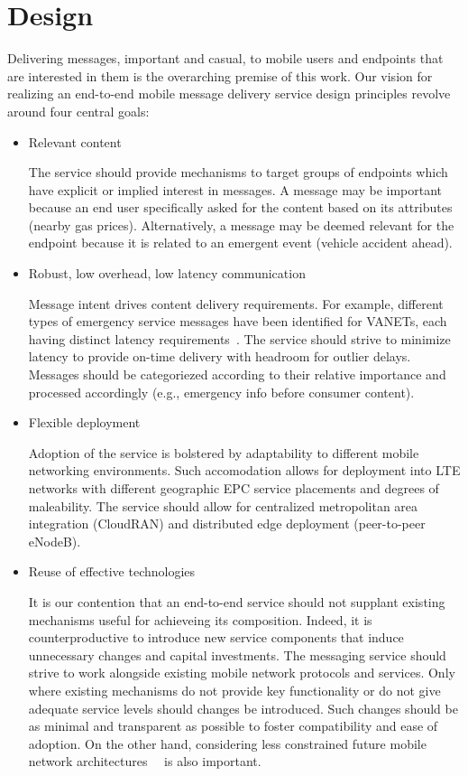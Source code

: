 \section{Design}

Delivering messages, important and casual, to mobile users and
endpoints that are interested in them is the overarching premise of
this work. Our vision for realizing an end-to-end mobile message
delivery service design principles revolve around four central
goals:

\begin{itemize}
\item Relevant content

The service should provide mechanisms to target groups of endpoints
which have explicit or implied interest in messages. A message may be
important because an end user specifically asked for the content based
on its attributes (nearby gas prices). Alternatively, a message may be
deemed relevant for the endpoint because it is related to an emergent
event (vehicle accident ahead).

\item Robust, low overhead, low latency communication

Message intent drives content delivery requirements.  For example,
different types of emergency service messages have been identified for
VANETs, each having distinct latency
requirements~\cite{vanet-msg-reqs}. The service should strive to
minimize latency to provide on-time delivery with headroom for outlier
delays. Messages should be categoriezed according to their relative
importance and processed accordingly (e.g., emergency info before
consumer content).

\item Flexible deployment

Adoption of the service is bolstered by adaptability to different
mobile networking environments.  Such accomodation allows for
deployment into LTE networks with different geographic EPC service
placements and degrees of maleability.  The service should allow for
centralized metropolitan area integration (CloudRAN) and distributed
edge deployment (peer-to-peer eNodeB).

\item Reuse of effective technologies

It is our contention that an end-to-end service should not supplant
existing mechanisms useful for achieveing its composition.  Indeed, it
is counterproductive to introduce new service components that induce
unnecessary changes and capital investments. The messaging service
should strive to work alongside existing mobile network protocols and
services.  Only where existing mechanisms do not provide key
functionality or do not give adequate service levels should changes be
introduced.  Such changes should be as minimal and transparent as
possible to foster compatibility and ease of adoption. On the other
hand, considering less constrained future mobile network
architectures~\cite{5G}~\cite{venkataramani2014mobility} is also important.

\end{itemize}

